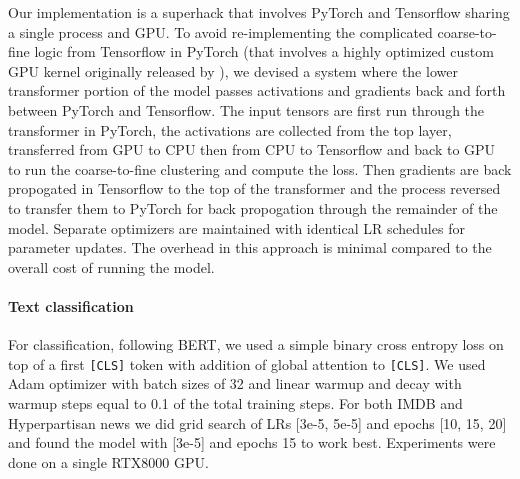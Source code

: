 Our implementation is a superhack that involves PyTorch and Tensorflow sharing a single process and GPU.  To avoid re-implementing the complicated coarse-to-fine logic from Tensorflow in PyTorch (that involves a highly optimized custom GPU kernel originally released by \citet{lee-etal-2018-higher}), we devised a system where the lower transformer portion of the model passes activations and gradients back and forth between PyTorch and Tensorflow.  The input tensors are first run through the transformer in PyTorch, the activations are collected from the top layer, transferred from GPU to CPU then from CPU to Tensorflow and back to GPU to run the coarse-to-fine clustering and compute the loss.  Then gradients are back propogated in Tensorflow to the top of the transformer and the process reversed to transfer them to PyTorch for back propogation through the remainder of the model.  Separate optimizers are maintained with identical LR schedules for parameter updates.  The overhead in this approach is minimal compared to the overall cost of running the model.


\paragraph{Text classification}
For classification, following BERT, we used a simple binary cross entropy loss on top of a first \texttt{[CLS]} token with addition of global attention to \texttt{[CLS]}. We used Adam optimizer with batch sizes of 32 and linear warmup and decay with warmup steps equal to 0.1 of the total training steps. For both IMDB and Hyperpartisan news we did grid search of LRs [3e-5, 5e-5] and epochs [10, 15, 20] and found the model with [3e-5] and epochs 15 to work best. Experiments were done on a single RTX8000 GPU. 




